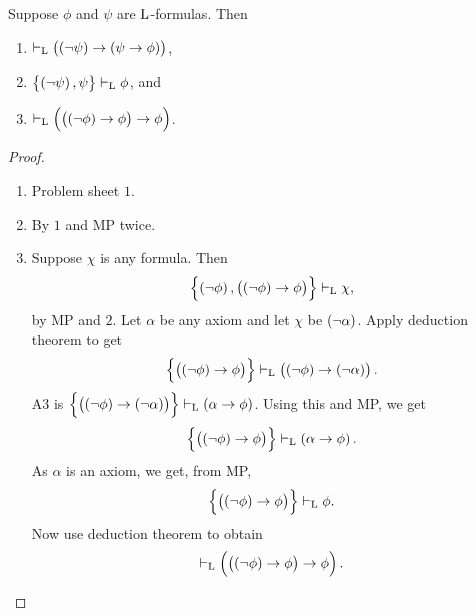 \pagebreak

\begin{proposition}
\label{prop:1.2.7}
Suppose $ \phi $ and $ \psi $ are $ \mathrm{L} $-formulas. Then
\begin{enumerate}
\item $ \vdash_\L \impb{\notb{\psi}}{\impb{\psi}{\phi}} $,
\item $ \cbr{\notb{\psi}, \psi} \vdash_\L \phi $, and
\item $ \vdash_\L \impb{\impb{\notb{\phi}}{\phi}}{\phi} $.
\end{enumerate}
\end{proposition}

\begin{proof}
\hfill
\begin{enumerate}
\item Problem sheet $ 1 $.
\item By $ 1 $ and MP twice.
\item Suppose $ \chi $ is any formula. Then
$$ \cbr{\notb{\phi}, \impb{\notb{\phi}}{\phi}} \vdash_\L \chi, $$
by MP and $ 2 $. Let $ \alpha $ be any axiom and let $ \chi $ be $ \notb{\alpha} $. Apply deduction theorem to get
$$ \cbr{\impb{\notb{\phi}}{\phi}} \vdash_\L \impb{\notb{\phi}}{\notb{\alpha}}. $$
A3 is $ \cbr{\impb{\notb{\phi}}{\notb{\alpha}}} \vdash_\L \impb{\alpha}{\phi} $. Using this and MP, we get
$$ \cbr{\impb{\notb{\phi}}{\phi}} \vdash_\L \impb{\alpha}{\phi}. $$
As $ \alpha $ is an axiom, we get, from MP,
$$ \cbr{\impb{\notb{\phi}}{\phi}} \vdash_\L \phi. $$
Now use deduction theorem to obtain
$$ \vdash_\L \impb{\impb{\notb{\phi}}{\phi}}{\phi}. $$
\end{enumerate}
\end{proof}

